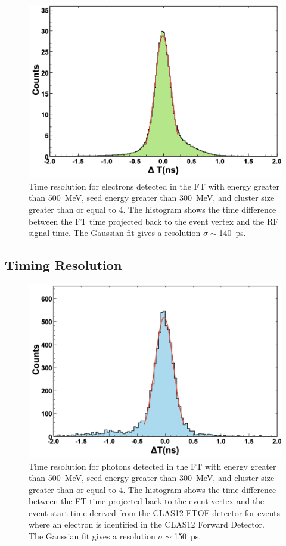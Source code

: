\begin{figure}[h]
  \centering
\includegraphics[height=0.6\columnwidth]{fig/ft_electron_time.png}
\caption{Time resolution for electrons detected in the FT with energy greater than 500~MeV, seed energy greater
  than 300~MeV, and cluster size greater than or equal to 4. The histogram shows the time difference between the
  FT time projected back to the event vertex and the RF signal time. The Gaussian fit gives a resolution
  $\sigma \sim$140~ps.}
\label{fig:electron_time}
\end{figure}

\subsection{Timing Resolution}

\begin{figure}[h]
\includegraphics[height=0.6\columnwidth]{fig/ft_gamma_time.png}
\caption{Time resolution for photons detected in the FT with energy greater than 500~MeV, seed
  energy greater than 300~MeV, and cluster size greater than or equal to 4. The histogram shows the time difference
  between the FT time projected back to the event vertex and the event start time derived from the CLAS12 FTOF
  detector for events where an electron is identified in the CLAS12 Forward Detector. The Gaussian fit gives a
  resolution $\sigma \sim$150~ps. }
\label{fig:gamma_time}
\end{figure}

